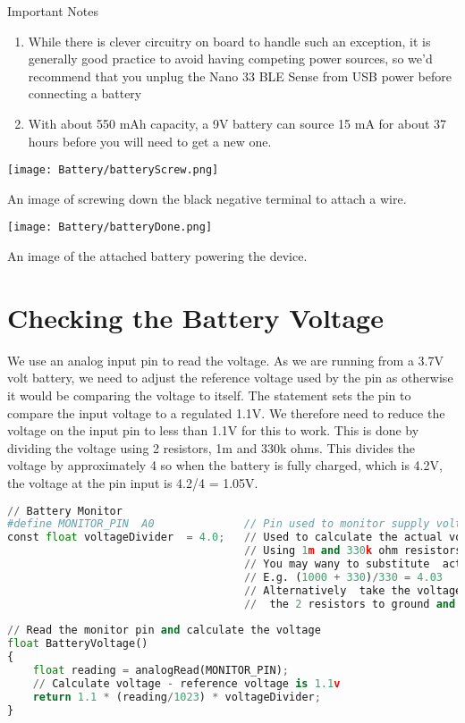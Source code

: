 \bigskip

Important Notes

\begin{enumerate}
    \item While there is clever circuitry on board to handle such an exception, it is generally good practice to avoid having competing power sources, so we’d recommend that you unplug the Nano 33 BLE Sense from USB power before connecting a battery
    
    \item With about 550 mAh capacity, a 9V battery can source 15 mA for about 37 hours before you will need to get a new one.
\end{enumerate}

\texttt{[image: Battery/batteryScrew.png]}


An image of screwing down the black negative terminal to attach a wire.

\texttt{[image: Battery/batteryDone.png]}

An image of the attached battery powering the device.


\section{Checking the Battery Voltage}

We use an analog input pin to read the voltage. As we are running from a 3.7V volt battery, we need to adjust the reference voltage used by the pin as otherwise it would be comparing the voltage to itself. The statement  sets the pin to compare the input voltage to a regulated 1.1V. We therefore need to reduce the voltage on the input pin to less than 1.1V for this to work. This is done by dividing the voltage using 2 resistors, 1m and 330k ohms. This divides the voltage by approximately 4 so when the battery is fully charged, which is 4.2V, the voltage at the pin input is 4.2/4 = 1.05V. 

\begin{lstlisting}[language=python]
// Battery Monitor
#define MONITOR_PIN  A0              // Pin used to monitor supply voltage
const float voltageDivider  = 4.0;   // Used to calculate the actual voltage fRom the monitor pin reading
                                     // Using 1m and 330k ohm resistors divids the  voltage by approx 4
                                     // You may wany to substitute  actual values of resistors in an equation (R1 + R2)/R2
                                     // E.g. (1000 + 330)/330 = 4.03
                                     // Alternatively  take the voltage reading across the battery and from the joint between 
                                     //  the 2 resistors to ground and divide one by the other to get the value.
    
// Read the monitor pin and calculate the voltage 
float BatteryVoltage()
{ 
    float reading = analogRead(MONITOR_PIN); 
    // Calculate voltage - reference voltage is 1.1v 
    return 1.1 * (reading/1023) * voltageDivider; 
} 
\end{lstlisting}

